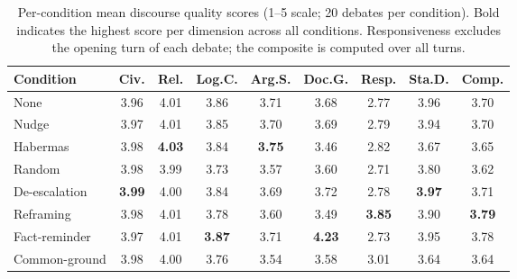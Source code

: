 \begin{table}[htbp]
\centering
\caption{Per-condition mean discourse quality scores (1--5 scale; 20 debates per condition). Bold indicates the highest score per dimension across all conditions. Responsiveness excludes the opening turn of each debate; the composite is computed over all turns.}
\label{tab:rq2-means}
\small
\begin{tabular}{l cccccccc}
\toprule
\textbf{Condition} & \textbf{Civ.} & \textbf{Rel.} & \textbf{Log.C.} & \textbf{Arg.S.} & \textbf{Doc.G.} & \textbf{Resp.} & \textbf{Sta.D.} & \textbf{Comp.} \\
\midrule
None & 3.96 & 4.01 & 3.86 & 3.71 & 3.68 & 2.77 & 3.96 & 3.70 \\
Nudge & 3.97 & 4.01 & 3.85 & 3.70 & 3.69 & 2.79 & 3.94 & 3.70 \\
Habermas & 3.98 & \textbf{4.03} & 3.84 & \textbf{3.75} & 3.46 & 2.82 & 3.67 & 3.65 \\
Random & 3.98 & 3.99 & 3.73 & 3.57 & 3.60 & 2.71 & 3.80 & 3.62 \\
\midrule
De-escalation & \textbf{3.99} & 4.00 & 3.84 & 3.69 & 3.72 & 2.78 & \textbf{3.97} & 3.71 \\
Reframing & 3.98 & 4.01 & 3.78 & 3.60 & 3.49 & \textbf{3.85} & 3.90 & \textbf{3.79} \\
Fact-reminder & 3.97 & 4.01 & \textbf{3.87} & 3.71 & \textbf{4.23} & 2.73 & 3.95 & 3.78 \\
Common-ground & 3.98 & 4.00 & 3.76 & 3.54 & 3.58 & 3.01 & 3.64 & 3.64 \\
\bottomrule
\end{tabular}
\end{table}